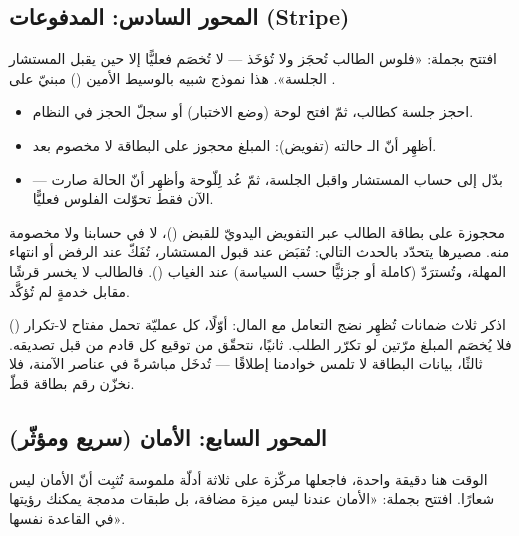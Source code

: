 \subsection{المحور السادس: المدفوعات (Stripe)}

افتتح بجملة: «فلوس الطالب تُحجَز ولا تُؤخَذ — لا تُخصَم فعليًّا إلا حين يقبل المستشار
الجلسة». هذا نموذج شبيه بالوسيط الأمين () مبنيّ على .

\begin{idea}
\begin{itemize}
\item احجز جلسة كطالب، ثمّ افتح لوحة  (وضع الاختبار) أو سجلّ الحجز في
  النظام.
\item أظهِر أنّ الـ حالته  (تفويض): المبلغ محجوز
  على البطاقة لا مخصوم بعد.
\item بدّل إلى حساب المستشار واقبل الجلسة، ثمّ عُد لِلّوحة وأظهِر أنّ الحالة صارت
   — الآن فقط تحوّلت الفلوس فعليًّا.
\end{itemize}
\end{idea}

\begin{qa}
محجوزة على بطاقة الطالب عبر التفويض اليدويّ للقبض ()، لا في
حسابنا ولا مخصومة منه. مصيرها يتحدّد بالحدث التالي: تُقبَض عند قبول المستشار،
تُفَكّ عند الرفض أو انتهاء المهلة، وتُسترَدّ (كاملة أو جزئيًّا حسب السياسة) عند
الغياب (). فالطالب لا يخسر قرشًا مقابل خدمةٍ لم تُؤكَّد.
\end{qa}

\begin{secnote}
اذكر ثلاث ضمانات تُظهِر نضج التعامل مع المال: أوّلًا، كل عمليّة تحمل مفتاح
لا-تكرار () فلا يُخصَم المبلغ مرّتين لو تكرّر الطلب. ثانيًا، نتحقّق من
توقيع كل  قادم من  قبل تصديقه. ثالثًا، بيانات البطاقة لا تلمس
خوادمنا إطلاقًا — تُدخَل مباشرةً في عناصر  الآمنة، فلا نخزّن رقم بطاقة قطّ.
\end{secnote}

\subsection{المحور السابع: الأمان (سريع ومؤثّر)}

الوقت هنا دقيقة واحدة، فاجعلها مركّزة على ثلاثة أدلّة ملموسة تُثبِت أنّ الأمان ليس
شعارًا. افتتح بجملة: «الأمان عندنا ليس ميزة مضافة، بل طبقات مدمجة يمكنك رؤيتها في
القاعدة نفسها».

